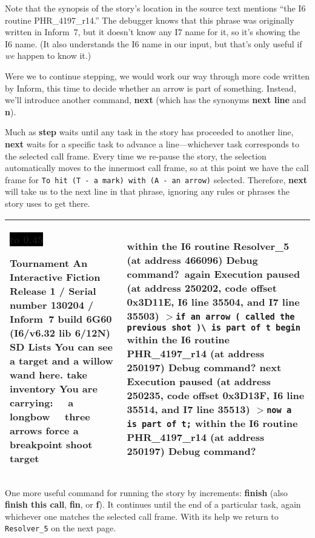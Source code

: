 \documentclass{book}
\newcommand{\n}{\hspace*{\fill}\newline}
\newcommand{\terp}[2]{\begin{center}\begin{tabular}{p{0.45\textwidth}|p{0.45\textwidth}}\midrule #1&#2\\\midrule\end{tabular}\end{center}}
\newcommand{\glkheading}[1]{\textbf{#1}}
\newcommand{\glkinput}[1]{\textbf{#1}}
\newcommand{\glkstatusline}[2]{\centerline{\colorbox{black}{\hbox to 0.45\textwidth{\textcolor{white}{#1\hfil #2}}}}}
\newcommand{\storyprompt}{\raisebox{1.5pt}{\(>\)}}
\newcommand{\cursor}{\raisebox{-1.5pt}{\RectangleThin}}
\newcommand{\markedindent}{\(>\)\qquad}
\begin{document}
Note that the synopsis of the story's location in the source text mentions ``the
I6 routine PHR\_4197\_r14.''  The debugger knows that this phrase was originally
written in Inform~7, but it doesn't know any I7 name for it, so it's showing the
I6 name.  (It also understands the I6 name in our input, but that's only useful
if \emph{we} happen to know it.)

Were we to continue stepping, we would work our way through more code written by
Inform, this time to decide whether an arrow is part of something.  Instead,
we'll introduce another command, \glkinput{next} (which has the synonyms
\glkinput{next line} and \glkinput{n}).

Much as \glkinput{step} waits until any task in the story has proceeded to
another line, \glkinput{next} waits for a specific task to advance a
line---whichever task corresponds to the selected call frame.  Every time we
re-pause the story, the selection automatically moves to the innermost call
frame, so at this point we have the call frame for
\lstinline{To hit (T - a mark)}\lstinline{ with (A - an arrow)} selected.
Therefore, \glkinput{next} will take us to the next line in that phrase,
ignoring any rules or phrases the story uses to get there.

\terp{\glkstatusline{Lists}{0/2}\n
  \glkheading{Tournament}\n
  An Interactive Fiction\n
  Release 1 / Serial number 130204 / Inform~7 build 6G60 (I6/v6.32 lib 6/12N) SD\n
  \n
  \glkheading{Lists}\n
  You can see a target and a willow wand here.\n
  \n
  \storyprompt\glkinput{take inventory}\n
  You are carrying:\n
  \null\ \ a longbow\n
  \null\ \ three arrows\n
  \n
  \storyprompt\glkinput{force a breakpoint}\n
  \storyprompt\glkinput{shoot target}}{%
  within the I6 routine Resolver\_5 (at address 466096)\n
  \n
  Debug command?\ \glkinput{again}\n
  \n
  Execution paused (at address 250202, code offset 0x3D11E, I6 line 35504, and I7 line 35503)\n
  \markedindent \lstinline{if an arrow ( called the previous shot )}\lstinline{\ is part of t begin}\n
  within the I6 routine PHR\_4197\_r14 (at address 250197)\n
  \n
  Debug command? \glkinput{next}\n
  \n
  Execution paused (at address 250235, code offset 0x3D13F, I6 line 35514, and I7 line 35513)\n
  \markedindent \lstinline{now a is part of t;}\n
  within the I6 routine PHR\_4197\_r14 (at address 250197)\n
  \n
  Debug command?\ \cursor}

One more useful command for running the story by increments: \glkinput{finish}
(also \glkinput{finish this call}, \glkinput{fin}, or \glkinput{f}).  It
continues until the end of a particular task, again whichever one matches the
selected call frame.  With its help we return to \lstinline{Resolver_5} on the
next page.
\end{document}
